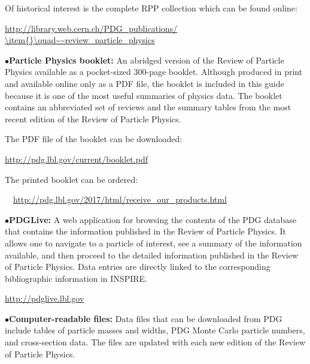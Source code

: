 \item{} Of historical interest is the complete RPP collection which can be found online:

         \item{}\quad\url{http://library.web.cern.ch/PDG\_publications/ 
         \item{}\quad~~review\_particle\_physics}


\item{$\bullet$}{\bf Particle Physics booklet:}
An abridged version of the Review of Particle Physics available as a pocket-sized 
300-page booklet. Although produced in print and available online only as a PDF file, 
the booklet is included in this guide because it is one of the most useful summaries 
of physics data. The booklet contains an abbreviated set of reviews and the summary 
tables from the most recent edition of the Review of Particle Physics.

\item{} The PDF file of the booklet can be downloaded: 

         \item{}\qquad\url{http://pdg.lbl.gov/current/booklet.pdf}

\item{} The printed booklet can be ordered: 

         \item{}~~\url{http://pdg.lbl.gov/2017/html/receive\_our\_products.html}


\medskip

\item{$\bullet$}{\bf PDGLive:}
A web application for browsing the contents of the PDG database that contains the information published in the Review of Particle Physics. It allows one to navigate to a particle of interest, see a summary of the information available, and then proceed to the detailed information published in the Review of Particle Physics. Data entries are directly linked to the corresponding bibliographic information in INSPIRE.

    \item{}\qquad\url{http://pdglive.lbl.gov}


\medskip

\item{$\bullet$}{\bf Computer-readable files:}
Data files that can be downloaded from PDG include tables of particle masses and widths, PDG Monte Carlo particle numbers, and cross-section data. The files are updated with each new edition of the Review of Particle Physics. 

